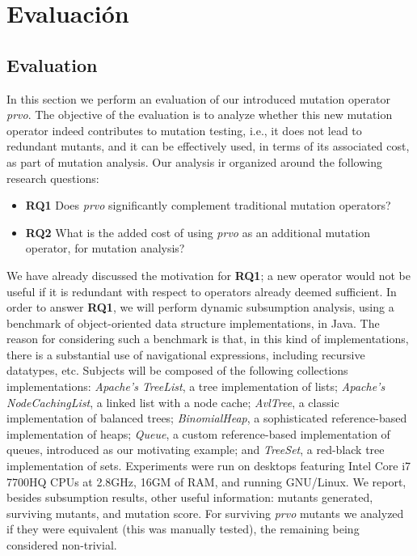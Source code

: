\chapter[Evaluaci\'on]{Evaluaci\'on}
\label{sec:evaluation}

\section{Evaluation}

In this section we perform an evaluation of our introduced mutation operator \emph{prvo}. The objective of the evaluation is to analyze whether this new mutation operator indeed contributes to mutation testing, i.e., it does not lead to redundant mutants, and it can be effectively used, in terms of its associated cost, as part of mutation analysis. Our analysis ir organized around the following research questions:  
\begin{itemize}
	
	\item \textbf{RQ1} Does \emph{prvo} significantly complement traditional mutation operators?
	
	\item \textbf{RQ2} What is the added cost of using \emph{prvo} as an additional mutation operator, for mutation analysis?
	
\end{itemize}

We have already discussed the motivation for \textbf{RQ1}; a new operator would not be useful if it is redundant with respect to operators already deemed sufficient. In order to answer \textbf{RQ1}, we will perform dynamic subsumption analysis, using a benchmark of object-oriented data structure implementations, in Java. The reason for considering such a benchmark is that, in this kind of implementations, there is a substantial use of navigational expressions, including recursive datatypes, etc. Subjects will be composed of the following collections implementations: \emph{Apache's TreeList}, a tree implementation of lists; \emph{Apache's NodeCachingList}, a linked list with a node cache; \emph{AvlTree}, a classic implementation of balanced trees; \emph{BinomialHeap}, a sophisticated reference-based implementation of heaps; \emph{Queue}, a custom reference-based implementation of queues, introduced as our motivating example; and \emph{TreeSet}, a red-black tree implementation of sets. Experiments were run on desktops featuring Intel Core i7 7700HQ CPUs at 2.8GHz, 16GM of RAM, and running GNU/Linux. We report, besides subsumption results, other useful information: mutants generated, surviving mutants, and mutation score. For surviving \emph{prvo} mutants we analyzed if they were equivalent (this was manually tested), the remaining being considered non-trivial. 



